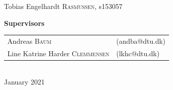\begin{titlepage}
\begin{center}
\large Tobias Engelhardt \textsc{Rasmussen}, s153057 %
\end{center}
\vspace{1cm}
\begin{center}
\large \textbf{Supervisors} \\
\begin{tabular}{ll}
   \large Andreas \textsc{Baum}  & (andba@dtu.dk)  \\
   \large Line Katrine Harder \textsc{Clemmensen}  & (lkhc@dtu.dk) 
\end{tabular}
\\[5cm]
{\large January 2021}\\[3cm]
\end{center}





 


\end{titlepage}


